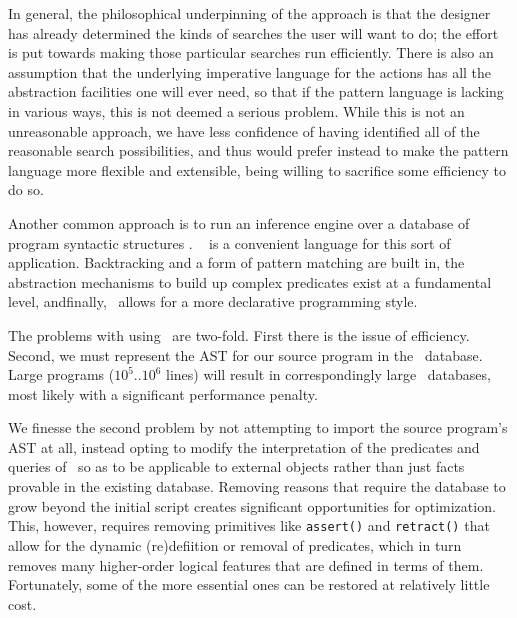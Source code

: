 In general, the philosophical underpinning of the  approach is that
the designer has already determined the kinds of searches the user will want to
do; the effort is put towards making those particular searches run efficiently.
There is also an assumption that the underlying imperative language for the
actions has all the abstraction facilities one will ever need, so that if the
pattern language is lacking in various ways, this is not deemed a serious
problem. While this is not an unreasonable approach, we have less confidence of
having identified all of the reasonable search possibilities, and thus would
prefer instead to make the pattern language more flexible and extensible, being
willing to sacrifice some efficiency to do so.


Another common approach is to run an inference engine over a database of program
syntactic structures \cite{BCD88, BGV90, CMR92}. \prolog\ \cite{SS86} is a
convenient language for this sort of application. Backtracking and a form of
pattern matching are built in, the abstraction mechanisms to build up complex
predicates exist at a fundamental level, andfinally, \prolog\ allows for a more
declarative programming style.

The problems with using \prolog\ are two-fold. First there is the issue of
efficiency. Second, we must represent the AST for our source program in the
\prolog\ database. Large programs ($10^5..10^6$ lines) will result in
correspondingly large \prolog\ databases, most likely with a significant
performance penalty.

We finesse the second problem by not attempting to import the source program's
AST at all, instead opting to modify the interpretation of the predicates and
queries of \prolog\ so as to be applicable to external objects rather than just
facts provable in the existing database. Removing reasons that require the
database to grow beyond the initial script creates significant opportunities for
optimization. This, however, requires removing primitives like \verb|assert()|
and \verb|retract()| that allow for the dynamic (re)defiition or removal of
predicates, which in turn removes many higher-order logical features that are
defined in terms of them. Fortunately, some of the more essential ones can be
restored at relatively little cost.

\secup

\secdown


